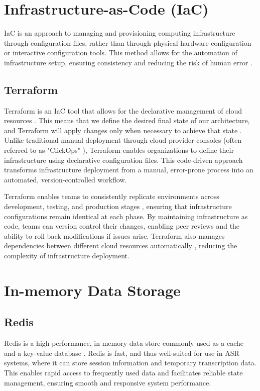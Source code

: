 \section{Infrastructure-as-Code (IaC)}
IaC is an approach to managing and provisioning computing infrastructure through  configuration files, rather than through physical hardware configuration or interactive configuration tools. This method allows for the automation of infrastructure setup, ensuring consistency and reducing the risk of human error \cite{iac_benefits}.

\subsection{Terraform}
Terraform is an IaC tool that allows for the declarative management of cloud resources \cite{terraform_hashicorp}. This means that we define the desired final state of our architecture, and Terraform will apply changes only when necessary to achieve that state \cite{terraform_declarative}. Unlike traditional manual deployment through cloud provider consoles (often referred to as "ClickOps" \cite{clickops}), Terraform enables organizations to define their infrastructure using declarative configuration files. This code-driven approach transforms infrastructure deployment from a manual, error-prone process into an automated, version-controlled workflow.

Terraform enables teams to consistently replicate environments across development, testing, and production stages \cite{iac_benefits}, ensuring that infrastructure configurations remain identical at each phase. By maintaining infrastructure as code, teams can version control their changes, enabling peer reviews and the ability to roll back modifications if issues arise. Terraform also manages dependencies between different cloud resources automatically \cite{terraform_dependencies}, reducing the complexity of infrastructure deployment. 

\section{In-memory Data Storage}
\subsection{Redis}
Redis is a high-performance, in-memory data store commonly used as a cache and a key-value database \cite{redis_definition}. Redis is fast, and thus well-suited for use in ASR systems, where it can store session information and temporary transcription data. This enables rapid access to frequently used data and facilitates reliable state management, ensuring smooth and responsive system performance.


